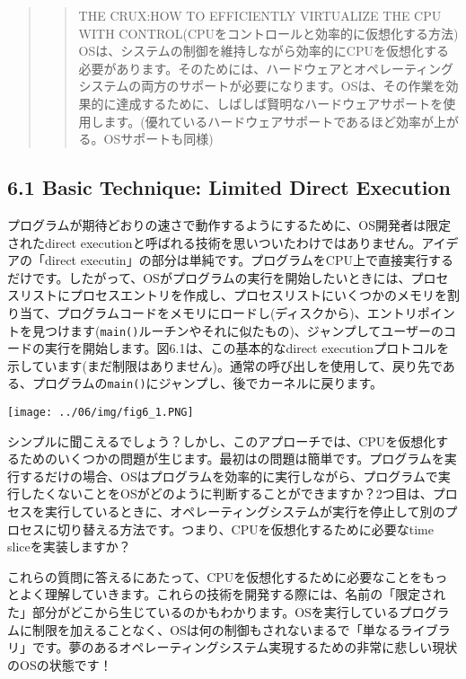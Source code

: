 \begin{quote}
\begin{quote}
THE CRUX:HOW TO EFFICIENTLY VIRTUALIZE THE CPU WITH
CONTROL(CPUをコントロールと効率的に仮想化する方法)\\
OSは、システムの制御を維持しながら効率的にCPUを仮想化する必要があります。そのためには、ハードウェアとオペレーティングシステムの両方のサポートが必要になります。OSは、その作業を効果的に達成するために、しばしば賢明なハードウェアサポートを使用します。(優れているハードウェアサポートであるほど効率が上がる。OSサポートも同様)
\end{quote}
\end{quote}

\hypertarget{basic-technique-limited-direct-execution}{%
\subsection*{6.1 Basic Technique: Limited Direct
Execution}\label{basic-technique-limited-direct-execution}}

プログラムが期待どおりの速さで動作するようにするために、OS開発者は限定されたdirect
executionと呼ばれる技術を思いついたわけではありません。アイデアの「direct
executin」の部分は単純です。プログラムをCPU上で直接実行するだけです。したがって、OSがプログラムの実行を開始したいときには、プロセスリストにプロセスエントリを作成し、プロセスリストにいくつかのメモリを割り当て、プログラムコードをメモリにロードし(ディスクから)、エントリポイントを見つけます(\texttt{main()}ルーチンやそれに似たもの)、ジャンプしてユーザーのコードの実行を開始します。図6.1は、この基本的なdirect
executionプロトコルを示しています(まだ制限はありません)。通常の呼び出しを使用して、戻り先である、プログラムの\texttt{main()}にジャンプし、後でカーネルに戻ります。

\texttt{[image: ../06/img/fig6\_1.PNG]}

シンプルに聞こえるでしょう？しかし、このアプローチでは、CPUを仮想化するためのいくつかの問題が生じます。最初はの問題は簡単です。プログラムを実行するだけの場合、OSはプログラムを効率的に実行しながら、プログラムで実行したくないことをOSがどのように判断することができますか？2つ目は、プロセスを実行しているときに、オペレーティングシステムが実行を停止して別のプロセスに切り替える方法です。つまり、CPUを仮想化するために必要なtime
sliceを実装しますか？

これらの質問に答えるにあたって、CPUを仮想化するために必要なことをもっとよく理解していきます。これらの技術を開発する際には、名前の「限定された」部分がどこから生じているのかもわかります。OSを実行しているプログラムに制限を加えることなく、OSは何の制御もされないまるで「単なるライブラリ」です。夢のあるオペレーティングシステム実現するための非常に悲しい現状のOSの状態です！

